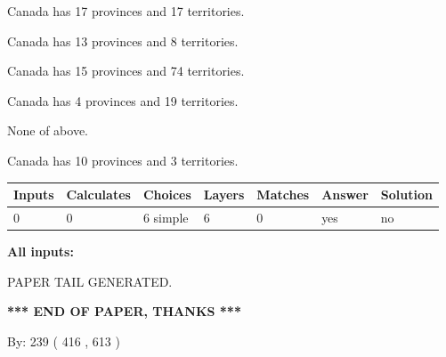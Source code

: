 \documentclass[12pt]{article}
\begin{document}
 
Canada has  17 provinces and  17 territories.
 
 
Canada has  13 provinces and  8 territories.
 
 
Canada has  15 provinces and  74 territories.
 
 
Canada has   4 provinces and  19 territories.
 
 
 None of above.
 
 
\noindent{}
 
 
Canada has 10  provinces and 3 territories.
 
 
\noindent{}
 
 
   
   
   
   
\noindent\begin{tabular}{|l|l|l|l|l|l|l|}
 \hline
Inputs & Calculates & Choices & Layers & Matches & Answer & Solution \\ \hline
 0  & 
 0  & 
 6
  simple  
  & 
 6  & 
 0  & 
  yes & 
  no 
  \\ \hline
 \end{tabular}
   
   
   
   
\noindent{}
   
   
   
   
\noindent\vspace{0.1in}\hspace{-0.08in} {\textbf{\Large{All inputs: }}}
   
   
   
   
   
   
 \vspace{0.2in}
 
   
   
\vspace{2.0in} PAPER TAIL GENERATED.
   
   
   
   
\vspace{1.0in} 
{\textbf{\large{ *** END OF PAPER, THANKS *** }}} 
   
   
\hspace{1.0in} By: 
 239 ( 416 ,  613 )
   
\end{document}
